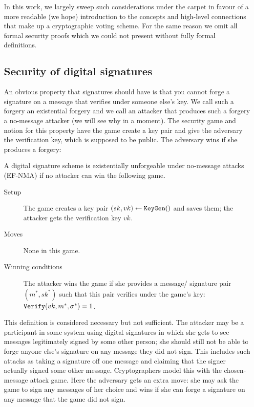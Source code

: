 \documentclass[envcountsame]{llncs}
\newcommand{\alg}[1]{\textup{\texttt{#1}}}
\begin{document}

In this work, we largely sweep such considerations under the carpet in favour of
a more readable (we hope) introduction to the concepts and high-level
connections that make up a cryptographic voting scheme. For the same reason we
omit all formal security proofs which we could not present without fully formal
definitions.

\subsection{Security of digital signatures}

An obvious property that signatures should have is that you cannot forge a
signature on a message that verifies under someone else's key. We call such a
forgery an existential forgery and we call an attacker that produces such a
forgery a no-message attacker (we will see why in a moment). The security game
and notion for this property have the game create a key pair and give the
adversary the verification key, which is supposed to be public. The adversary
wins if she produces a forgery:

\begin{definition}
A digital signature scheme is existentially unforgeable under no-message attacks
(EF-NMA) if no attacker can win the following game.

    \begin{description}
    \item[Setup] The game creates a key pair $(sk, vk) \gets \alg{KeyGen}()$ and
                 saves them; the attacker gets the verification key $vk$.

    \item[Moves] None in this game.

    \item[Winning conditions] The attacker wins the game if she provides a
    message/ signature pair $(m^*, sk^*)$ such that this pair verifies under the
    game's key: $\alg{Verify}(vk, m^*, \sigma^*) = 1$.
    \end{description}
\end{definition}

This definition is considered necessary but not sufficient. The attacker may be
a participant in some system using digital signatures in which she gets to see
messages legitimately signed by some other person; she should still not be able
to forge anyone else's signature on any message they did not sign. This includes
such attacks as taking a signature off one message and claiming that the signer
actually signed some other message. Cryptographers model this with the chosen-
message attack game. Here the adversary gets an extra move: she may ask the game
to sign any messages of her choice and wins if she can forge a signature on any
message that the game did not sign.
\end{document}
